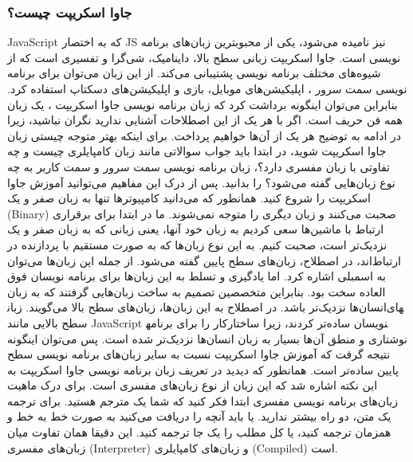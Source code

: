 \subsubsection{جاوا اسکریپت چیست؟}
JavaScript که به اختصار JS نیز نامیده می‌شود، یکی از محبوبترین زبان‌های برنامه نویسی است. جاوا اسکریپت زبانی سطح بالا، داینامیک، شی‌گرا و تفسیری است که از شیوه‌های مختلف برنامه نویسی پشتیبانی می‌کند. از این زبان می‌توان برای برنامه نویسی سمت سرور ،
 اپلیکیشن‌های موبایل، بازی و اپلیکیشن‌های دسکتاپ استفاده کرد. بنابراین می‌توان اینگونه برداشت کرد که زبان برنامه نویسی جاوا اسکریپت ، یک زبان همه فن حریف است.
اگر با هر یک از این اصطلاحات آشنایی ندارید نگران نباشید، زیرا در ادامه به توضیح هر یک از آن‌ها خواهیم پرداخت. برای اینکه بهتر متوجه چیستی زبان جاوا اسکریپت شوید، در ابتدا باید جواب سوالاتی مانند زبان کامپایلری چیست و چه تفاوتی با زبان مفسری دارد؟، زبان برنامه نویسی سمت سرور و سمت کاربر به چه نوع زبان‌هایی گفته می‌شود؟ را بدانید. پس از درک این مفاهیم می‌توانید آموزش جاوا اسکریپت را شروع کنید.
همانطور که می‌دانید کامپیوترها تنها به زبان صفر و یک (Binary) صحبت می‌کنند و زبان دیگری را متوجه نمی‌شوند. ما در ابتدا برای برقراری ارتباط با ماشین‌ها سعی کردیم به زبان خود آنها، یعنی زبانی که به زبان صفر و یک نزدیک‌تر است، صحبت کنیم. به این نوع زبان‌ها که به صورت مستقیم با پردازنده در ارتباط‌اند، در اصطلاح، زبان‌های سطح پایین
 گفته می‌شود. از جمله این زبان‌ها می‌توان به اسمبلی اشاره کرد.
اما یادگیری و تسلط به این زبان‌ها برای برنامه نویسان فوق العاده سخت بود. بنابراین متخصصین تصمیم به ساخت زبان‌هایی گرفتند که به زبان انسان‌ها نزدیک‌تر باشد. در اصطلاح به این زبان‌ها، زبان‌های سطح بالا
 می‌گویند. زبان‎های سطح بالایی مانند JavaScript کار را برای برنامه‎نویسان ساده‌تر کردند، زیرا ساختار نوشتاری و منطق آن‌ها بسیار به زبان انسان‌ها نزدیک‌تر شده است. پس می‌توان اینگونه نتیجه گرفت که آموزش جاوا اسکریپت نسبت به سایر زبان‌های برنامه نویسی سطح پایین ساده‌تر است.
همانطور که دیدید در تعریف زبان برنامه نویسی جاوا اسکریپت به این نکته اشاره شد که این زبان از نوع زبان‌های مفسری است. برای درک ماهیت زبان‌های برنامه نویسی مفسری ابتدا فکر کنید که شما یک مترجم هستید. برای ترجمه یک متن، دو راه بیشتر ندارید. یا باید آنچه را دریافت می‌کنید به صورت خط به خط و همزمان ترجمه کنید، یا کل مطلب را یک جا ترجمه کنید. این دقیقا همان تفاوت میان زبان‌های مفسری (Interpreter) و زبان‌های کامپایلری (Compiled) است.

